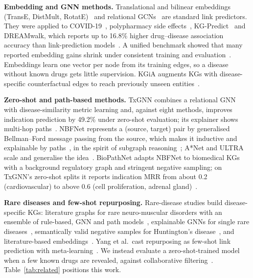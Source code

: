 \documentclass[journal]{IEEEtran}
\begin{document}
\textbf{Embedding and GNN methods.} Translational and bilinear embeddings (TransE, DistMult, RotatE)~\cite{bordes2013transe,yang2015distmult,sun2019rotate} and relational GCNs~\cite{schlichtkrull2018rgcn} are standard link predictors. They were applied to COVID-19~\cite{zhang2021covidkg,morselli2021covid}, polypharmacy side effects~\cite{zitnik2018decagon}, KG-Predict~\cite{gao2022kgpredict} and DREAMwalk, which reports up to 16.8\% higher drug--disease association accuracy than link-prediction models~\cite{bang2023dreamwalk}. A unified benchmark showed that many reported embedding gains shrink under consistent training and evaluation~\cite{ali2021pykeen}. Embeddings learn one vector per node from its training edges, so a disease without known drugs gets little supervision. KGiA augments KGs with disease-specific counterfactual edges to reach previously unseen entities~\cite{oguztuzun2025kgia}.

\textbf{Zero-shot and path-based methods.} TxGNN combines a relational GNN with disease-similarity metric learning and, against eight methods, improves indication prediction by 49.2\% under zero-shot evaluation; its explainer shows multi-hop paths~\cite{huang2024txgnn}. NBFNet represents a (source, target) pair by generalised Bellman--Ford message passing from the source, which makes it inductive and explainable by paths~\cite{zhu2021nbfnet}, in the spirit of subgraph reasoning~\cite{teru2020grail}; A*Net and ULTRA scale and generalise the idea~\cite{zhu2023astarnet,galkin2024ultra}. BioPathNet adapts NBFNet to biomedical KGs with a background regulatory graph and stringent negative sampling; on TxGNN's zero-shot splits it reports indication MRR from about 0.2 (cardiovascular) to above 0.6 (cell proliferation, adrenal gland)~\cite{hu2026biopathnet}.

\textbf{Rare diseases and few-shot repurposing.} Rare-disease studies build disease-specific KGs: literature graphs for rare neuro-muscular disorders with an ensemble of rule-based, GNN and path models~\cite{papadimas2026neuromuscular}, explainable GNNs for single rare diseases~\cite{perdomo2026rdexplainer}, semantically valid negative samples for Huntington's disease~\cite{bianchi2026negatives}, and literature-based embeddings~\cite{sosa2020rare}. Yang et al.\ cast repurposing as few-shot link prediction with meta-learning~\cite{yang2024fewshot}. We instead evaluate a zero-shot-trained model when a few known drugs are revealed, against collaborative filtering~\cite{sarwar2001itemcf}. Table~\ref{tab:related} positions this work.
\end{document}
